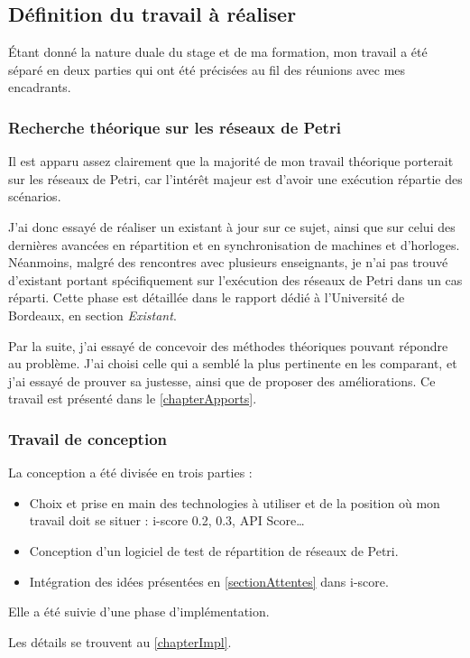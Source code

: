 \subsection{Définition du travail à réaliser}
Étant donné la nature duale du stage et de ma formation, mon travail a été séparé en deux parties qui ont été précisées au fil des réunions avec mes encadrants.

\subsubsection{Recherche théorique sur les réseaux de Petri}
Il est apparu assez clairement que la majorité de mon travail théorique porterait sur les réseaux de Petri, car l'intérêt majeur est d'avoir une exécution répartie des scénarios.

J'ai donc essayé de réaliser un existant à jour sur ce sujet, ainsi que sur celui des dernières avancées en répartition et en synchronisation de machines et d'horloges.
Néanmoins, malgré des rencontres avec plusieurs enseignants, je n'ai pas trouvé d'existant portant spécifiquement sur l'exécution des réseaux de Petri dans un cas réparti.
Cette phase est détaillée dans le rapport dédié à l'Université de Bordeaux, en section \textit{Existant}.

Par la suite, j'ai essayé de concevoir des méthodes théoriques pouvant répondre au problème.
J'ai choisi celle qui a semblé la plus pertinente en les comparant, et j'ai essayé de prouver sa justesse, ainsi que de proposer des améliorations.
Ce travail est présenté dans le \cref{chapterApports}.

\subsubsection{Travail de conception}
La conception a été divisée en trois parties : 
\begin{itemize}
	\item Choix et prise en main des technologies à utiliser et de la position où mon travail doit se situer : i-score 0.2, 0.3, API Score\dots
	\item Conception d'un logiciel de test de répartition de réseaux de Petri.
	\item Intégration des idées présentées en \cref{sectionAttentes} dans i-score.
\end{itemize}

Elle a été suivie d'une phase d'implémentation.

Les détails se trouvent au \cref{chapterImpl}.

